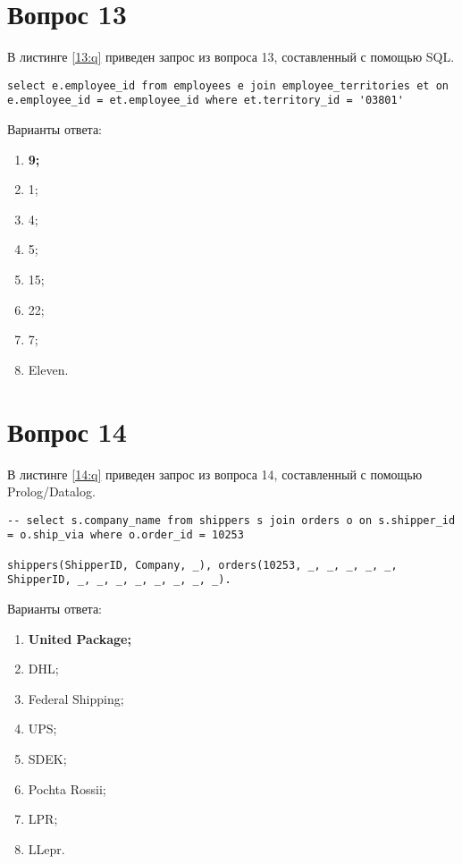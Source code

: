 \begin{appendices}
\section{Вопрос 13}

В листинге \ref{13:q} приведен запрос из вопроса 13, составленный с помощью SQL.

\begin{lstlisting}[label=13:q,caption=Вопрос 13]
select e.employee_id from employees e join employee_territories et on e.employee_id = et.employee_id where et.territory_id = '03801'
\end{lstlisting}

Варианты ответа:

\begin{enumerate}
	\item \textbf{9;}
	\item 1;
	\item 4;
	\item 5;
	\item 15;
	\item 22;
	\item 7;
	\item Eleven.
\end{enumerate}

\section{Вопрос 14}

В листинге \ref{14:q} приведен запрос из вопроса 14, составленный с помощью Prolog/Datalog.

\begin{lstlisting}[label=14:q,caption=Вопрос 14]
-- select s.company_name from shippers s join orders o on s.shipper_id = o.ship_via where o.order_id = 10253

shippers(ShipperID, Company, _), orders(10253, _, _, _, _, _, ShipperID, _, _, _, _, _, _, _, _).
\end{lstlisting}

Варианты ответа:

\begin{enumerate}
	\item \textbf{United Package;}
	\item DHL;
	\item Federal Shipping;
	\item UPS;
	\item SDEK;
	\item Pochta Rossii;
	\item LPR;
	\item LLepr.
\end{enumerate}


\end{appendices}
